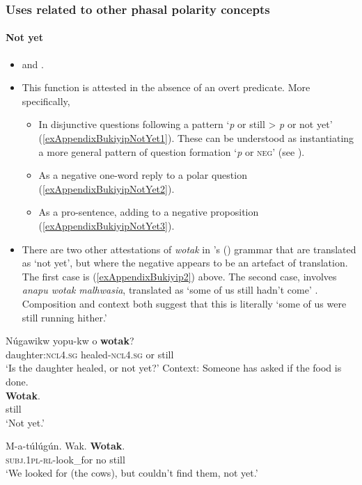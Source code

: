 \subsubsection{Uses related to other phasal polarity concepts}
\paragraph{Not yet}\label{appendixBukiyipNotYet}
\begin{itemize}
	\item \textcite[28]{Conrad1998} and \textcite[41, 43, 98–99, 167]{ConradWigoga1991}.
	\item This function is attested in the absence of an overt predicate. More specifically,
	\begin{itemize}
		\item In disjunctive questions following a pattern \lq \textit{p} or still > \textit{p} or not yet\rq{ }(\ref{exAppendixBukiyipNotYet1}). These can be understood as instantiating a more general pattern of question formation \lq \textit{p} or \textsc{neg}\rq{ }(see \cite[4]{ConradWigoga1991}).		
		\item As a negative one-word reply to a polar question (\ref{exAppendixBukiyipNotYet2}).
		\item As a pro-sentence, adding to a negative proposition (\ref{exAppendixBukiyipNotYet3}).
	\end{itemize}
	\item There are two other attestations of \textit{wotak} in \citeauthor{ConradWigoga1991}'s (\citeyear{ConradWigoga1991}) grammar that are translated as \lq not yet', but where the negative appears to be an artefact of translation. The first case is (\ref{exAppendixBukiyip2}) above. The second case, involves \textit{anapu wotak malhwasia}, translated as \lq some of us still hadn't come' \parencite[205, ex. 737]{ConradWigoga1991}. Composition and context both suggest that this is literally \lq some of us were still running hither.'
\end{itemize}

\begin{exe}
	\ex\label{exAppendixBukiyipNotYet1}
	\gll Núgawikw yopu-kw o \textbf{wotak}?\\
	daughter:\textsc{ncl}4.\textsc{sg} healed-\textsc{ncl}4.\textsc{sg} or still\\
	\glt \lq Is the daughter healed, or not yet?' \parencite[99]{ConradWigoga1991}
	\pagebreak
	\ex\label{exAppendixBukiyipNotYet2}
	 Context: Someone has asked if the food is done.\\
	\gll \textbf{Wotak}.\\
	still\\
	\glt \lq Not yet.' \parencite[146–147]{Fortune1942}

	\ex\label{exAppendixBukiyipNotYet3}
	\gll M-a-túlúgún. Wak. \textbf{Wotak}.\\
	\textsc{subj}.1\textsc{pl}-\textsc{rl}-look\_for no still\\
	\glt \lq We looked for (the cows), but couldn’t find them, not yet.\rq{ }\parencite[167]{ConradWigoga1991}
\end{exe}

